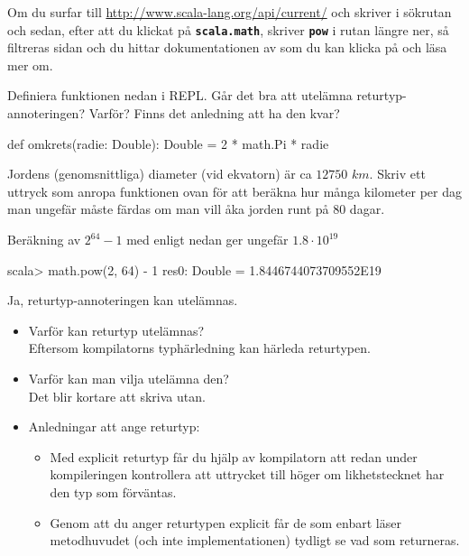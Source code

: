 Om du surfar till \url{http://www.scala-lang.org/api/current/} och skriver  i sökrutan och sedan, efter att du klickat på \textbf{\texttt{\small scala.math}}, skriver \textbf{\texttt{\small pow}} i rutan längre ner, så filtreras sidan och du hittar dokumentationen av  som du kan klicka på och läsa mer om.

\Subtask Definiera funktionen  nedan i REPL. Går det bra att utelämna returtyp-annoteringen? Varför? Finns det anledning att ha den kvar?
\begin{Code}
def omkrets(radie: Double): Double = 2 * math.Pi * radie
\end{Code}

\Subtask Jordens (genomsnittliga) diameter (vid ekvatorn) är ca $12 750$ $km$. Skriv ett uttryck som anropa funktionen  ovan för att beräkna hur många kilometer per dag man ungefär måste färdas om man vill åka jorden runt på 80 dagar.

\SOLUTION

\TaskSolved \what

\SubtaskSolved Beräkning av $2^{64} - 1$ med  enligt nedan ger ungefär $1.8 \cdot 10^{19}$
\begin{REPL}
scala> math.pow(2, 64) - 1
res0: Double = 1.8446744073709552E19
\end{REPL}

\SubtaskSolved Ja, returtyp-annoteringen  kan utelämnas.

\begin{itemize}
\item Varför kan returtyp utelämnas?\\Eftersom kompilatorns typhärledning kan härleda returtypen.
\item Varför kan man vilja utelämna den?\\Det blir kortare att skriva utan.
\item Anledningar att ange returtyp:
\begin{itemize}
\item  Med explicit returtyp får du hjälp av kompilatorn att redan under kompileringen kontrollera att uttrycket till höger om likhetstecknet har den typ som förväntas.

\item Genom att du anger returtypen explicit får de som enbart läser metodhuvudet (och inte implementationen)
 tydligt se vad som returneras.
\end{itemize}
\end{itemize}

